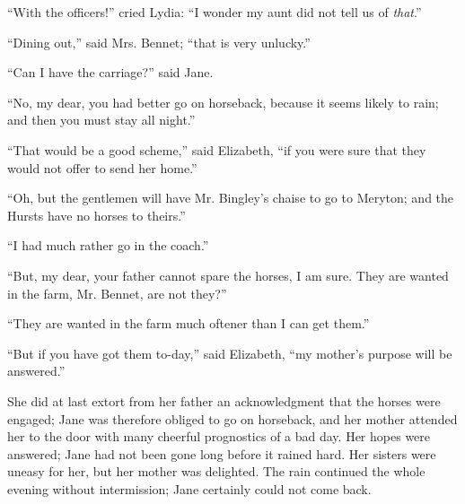 ``With the officers!'' cried Lydia: ``I wonder my aunt did not tell us of \textit{that}.''

``Dining out,'' said Mrs. Bennet; ``that is very unlucky.''

``Can I have the carriage?'' said Jane.

``No, my dear, you had better go on horseback, because it seems likely to rain; and then you must stay all night.''

``That would be a good scheme,'' said Elizabeth, ``if you were sure that they would not offer to send her home.''

``Oh, but the gentlemen will have Mr. Bingley's chaise to go to Meryton; and the Hursts have no horses to theirs.''

``I had much rather go in the coach.''

``But, my dear, your father cannot spare the horses, I am sure. They are wanted in the farm, Mr. Bennet, are not they?''


``They are wanted in the farm much oftener than I can get them.''

``But if you have got them to-day,'' said Elizabeth, ``my mother's purpose will be answered.''

She did at last extort from her father an acknowledgment that the horses were engaged; Jane was therefore obliged to go on horseback, and her mother attended her to the door with many cheerful prognostics of a bad day. Her hopes were answered; Jane had not been gone long before it rained hard. Her sisters were uneasy for her, but her mother was delighted. The rain continued the whole evening without intermission; Jane certainly could not come back.

